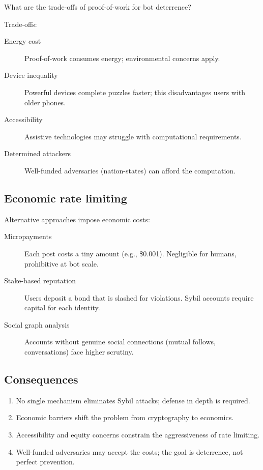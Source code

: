 \begin{exercise}
  What are the trade-offs of proof-of-work for bot deterrence?
\end{exercise}

Trade-offs:
\begin{description}
  \item[Energy cost] Proof-of-work consumes energy; environmental concerns 
    apply.
  \item[Device inequality] Powerful devices complete puzzles faster; this 
    disadvantages users with older phones.
  \item[Accessibility] Assistive technologies may struggle with computational 
    requirements.
  \item[Determined attackers] Well-funded adversaries (nation-states) can 
    afford the computation.
\end{description}

\subsection{Economic rate limiting}

Alternative approaches impose economic costs:
\begin{description}
  \item[Micropayments] Each post costs a tiny amount (e.g., \$0.001).
    Negligible for humans, prohibitive at bot scale.
  \item[Stake-based reputation] Users deposit a bond that is slashed for 
    violations.
    Sybil accounts require capital for each identity.
  \item[Social graph analysis] Accounts without genuine social connections 
    (mutual follows, conversations) face higher scrutiny.
\end{description}

\subsection{Consequences}

\begin{enumerate}
  \item No single mechanism eliminates Sybil attacks; defense in depth is 
    required.
  \item Economic barriers shift the problem from cryptography to economics.
  \item Accessibility and equity concerns constrain the aggressiveness of 
    rate limiting.
  \item Well-funded adversaries may accept the costs; the goal is deterrence, 
    not perfect prevention.
\end{enumerate}


